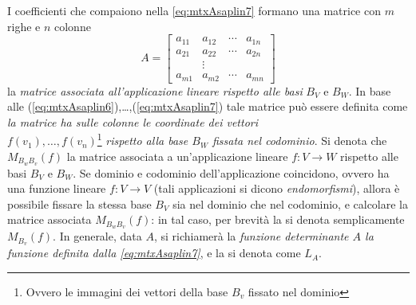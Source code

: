 \documentclass{book}
\theoremstyle{definition}
\theoremstyle{plain}
\begin{document}
I coefficienti che compaiono nella \ref{eq:mtxAsaplin7} formano una
matrice con $m$ righe e $n$ colonne
\begin{equation*}
  A=
  \begin{bmatrix}
    a_{11} & a_{12} & \cdots & a_{1n}\\
    a_{21} & a_{22} & \cdots & a_{2n}\\
           & \vdots\\
    a_{m1} & a_{m2} & \cdots & a_{mn}
  \end{bmatrix}
\end{equation*}
la \emph{matrice associata all'applicazione lineare rispetto alle basi}
$B_V$ e $B_W$. In base alle
(\ref{eq:mtxAsaplin6}),\dots,(\ref{eq:mtxAsaplin7}) tale matrice può
essere definita come \emph{la matrice ha sulle colonne le coordinate dei
  vettori\\ $f(v_1),\dots,f(v_n)$}\footnote{Ovvero le immagini dei vettori
  della base $B_v$ fissato nel dominio} \emph{rispetto alla base $B_W$
  fissata nel codominio}. Si denota che $M_{B_w B_v}(f)$ la matrice
associata a un'applicazione lineare $f:V\to W$ rispetto alle basi $B_V$
e $B_W$. Se dominio e codominio dell'applicazione coincidono, ovvero ha
una funzione lineare $f:V\to V$ (tali applicazioni si dicono
\emph{endomorfismi}), allora è possibile fissare la stessa base $B_V$
sia nel dominio che nel codominio, e calcolare la matrice associata
$M_{B_w B_v} (f)$: in tal caso, per brevità la si denota semplicamente
$M_{B_v} (f)$. In generale, data $A$, si richiamerà la \emph{funzione
  determinante $A$ la funzione definita dalla \ref{eq:mtxAsaplin7}}, e
la si denota come $L_A$.
\end{document}
